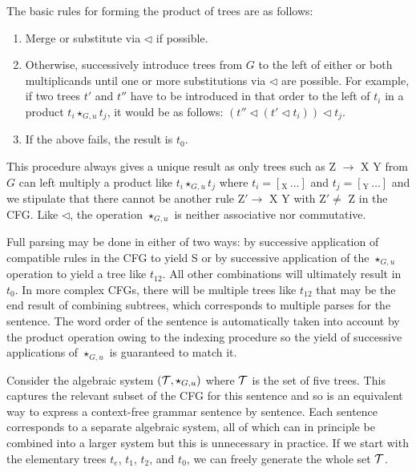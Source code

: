 The basic rules for forming the product of trees are as follows:

\begin{enumerate}
\item Merge or substitute via $\lhd$ if possible.
\item Otherwise, successively introduce trees from $G$ to the left of either or both multiplicands until one or more substitutions via $\lhd$ are possible. For example, if two trees $t'$ and $t''$ have to be introduced in that order to the left of $t_i$ in a product $t_i \star_{G,u} t_j$, it would be as follows: $(t'' \lhd (t' \lhd t_i)) \lhd t_j$.
\item If the above fails, the result is $t_0$.
\end{enumerate}

This procedure always gives a unique result as only trees such as Z $\to$ X Y from $G$ can left multiply a product like $t_i \star_{G,u} t_j$ where $t_i = [_{\mathrm{X}}\, \ldots ]$ and $t_j = [_{\mathrm{Y}}\, \ldots ]$ and we stipulate that there cannot be another rule $\mathrm{Z}' \to$ X Y with $\mathrm{Z}' \neq$ Z in the CFG. Like $\lhd$, the operation $\star_{G,u}$ is neither associative nor commutative.

Full parsing may be done in either of two ways: by successive application of compatible rules in the CFG to yield S or by successive application of the $\star_{G,u}$ operation to yield a tree like $t_{12}$. All other combinations will ultimately result in $t_0$. In more complex CFGs, there will be multiple trees like $t_{12}$ that may be the end result of combining subtrees, which corresponds to multiple parses for the sentence. The word order of the sentence is automatically taken into account by the product operation owing to the indexing procedure so the yield of successive applications of $\star_{G,u}$ is guaranteed to match it.

Consider the algebraic system $({\cal T},\star_{G,u})$ where $\cal T$ is the set of five trees. This captures the relevant subset of the CFG for this sentence and so is an equivalent way to express a context-free grammar sentence by sentence. Each sentence corresponds to a separate algebraic system, all of which can in principle be combined into a larger system but this is unnecessary in practice. If we start with the elementary trees $t_e$, $t_1$, $t_2$, and $t_0$, we can freely generate the whole set $\cal T$. 


